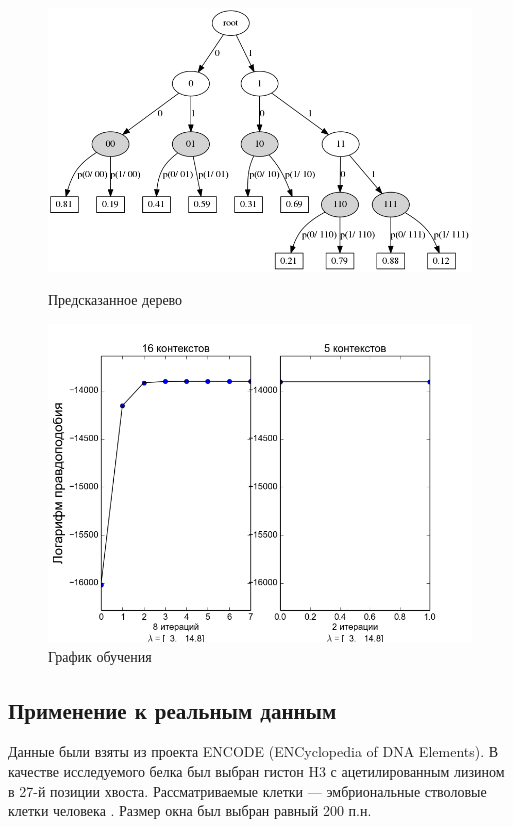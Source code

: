 \documentclass{matmex-diploma-custom}
\begin{document}
\begin{figure}[h!]
\begin{minipage}[b]{0.49 \textwidth}
\end{minipage}
\hfil \hfil%
\begin{minipage}[b]{0.49 \textwidth}
	\includegraphics[scale=0.3]{img/sample/predicted_trie.png}
	\centering
	\caption{ Предсказанное дерево }
	\label{ris:sample_predicted_trie}
\end{minipage}
\begin{minipage}[b]{0.8 \textwidth}
	\includegraphics[scale=0.4]{img/sample/plot_.png}
	\centering
	\caption{ График обучения }
	\label{ris:sample_log_likelihood}
\end{minipage}
\end{figure}

\subsection{Применение к реальным данным}
Данные были взяты из проекта ENCODE (ENCyclopedia of DNA Elements).
В качестве исследуемого белка был выбран гистон H3 с ацетилированным лизином в 27-й позиции хвоста. Рассматриваемые клетки --- эмбриональные стволовые клетки человека \cite{ENCODE}.
Размер окна был выбран равный 200 п.н.
\end{document}
